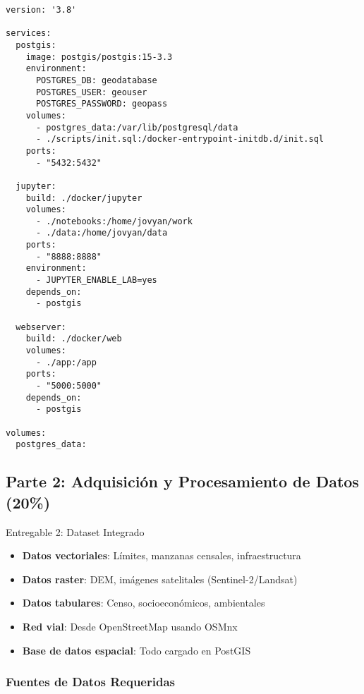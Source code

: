 \documentclass[12pt,a4paper]{article}
\begin{document}
\begin{verbatim}
version: '3.8'

services:
  postgis:
    image: postgis/postgis:15-3.3
    environment:
      POSTGRES_DB: geodatabase
      POSTGRES_USER: geouser
      POSTGRES_PASSWORD: geopass
    volumes:
      - postgres_data:/var/lib/postgresql/data
      - ./scripts/init.sql:/docker-entrypoint-initdb.d/init.sql
    ports:
      - "5432:5432"

  jupyter:
    build: ./docker/jupyter
    volumes:
      - ./notebooks:/home/jovyan/work
      - ./data:/home/jovyan/data
    ports:
      - "8888:8888"
    environment:
      - JUPYTER_ENABLE_LAB=yes
    depends_on:
      - postgis

  webserver:
    build: ./docker/web
    volumes:
      - ./app:/app
    ports:
      - "5000:5000"
    depends_on:
      - postgis

volumes:
  postgres_data:
\end{verbatim}

\subsection{Parte 2: Adquisición y Procesamiento de Datos (20\%)}

\begin{deliverable}{Entregable 2: Dataset Integrado}
\begin{itemize}
    \item \textbf{Datos vectoriales}: Límites, manzanas censales, infraestructura
    \item \textbf{Datos raster}: DEM, imágenes satelitales (Sentinel-2/Landsat)
    \item \textbf{Datos tabulares}: Censo, socioeconómicos, ambientales
    \item \textbf{Red vial}: Desde OpenStreetMap usando OSMnx
    \item \textbf{Base de datos espacial}: Todo cargado en PostGIS
\end{itemize}
\end{deliverable}

\subsubsection{Fuentes de Datos Requeridas}
\end{document}
